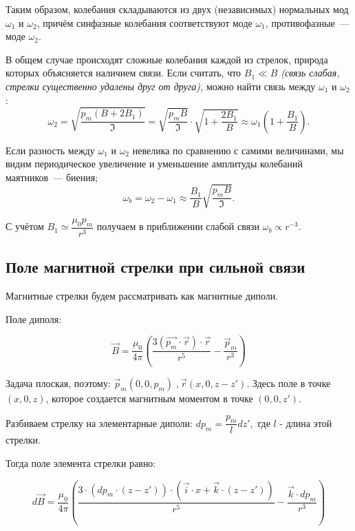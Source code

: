 \documentclass{letask}
\begin{document}
Таким образом, колебания складываются из двух (независимых) нормальных мод $\omega_1$ и $\omega_2$, причём синфазные колебания соответствуют моде $\omega_1$, противофазные~--- моде $\omega_2$.

В общем случае происходят сложные колебания каждой из стрелок, природа которых объясняется наличием связи. Если считать, что $B_1 \ll B$ \emph{(связь слабая, стрелки существенно удалены друг от друга),} можно найти связь между $\omega_1$ и $\omega_2$:
\begin{equation}
\omega_2 = \sqrt{\dfrac{p_m(B+2B_1)}{\mathfrak{I}}} = \sqrt{\dfrac{p_m B}{\mathfrak{I}}} \cdot \sqrt{1+\dfrac{2B_1}{B}} \approx \omega_1 \left( 1+\dfrac{B_1}{B} \right).
\end{equation}

Если разность между $\omega_1$ и $\omega_2$ невелика по сравнению с самими величинами, мы видим периодическое увеличение и уменьшение амплитуды колебаний маятников~--- биения;
\begin{equation}
\omega_b = \omega_2 - \omega_1 \approx \dfrac{B_1}{B} \sqrt{\dfrac{p_m B}{\mathfrak{I}}}.
\end{equation}

С учётом $B_1 \simeq \dfrac{\mu_0 p_m}{r^3}$ получаем в приближении слабой связи $\omega_b \propto r^{-3}$.

\subsection{Поле магнитной стрелки при сильной связи}

Магнитные стрелки будем рассматривать как магнитные диполи. 

Поле диполя:

$$\vec{B} = \dfrac{\mu_0}{4 \pi} \left(\dfrac{3(\vec{p_m} \cdot\vec{r}) \cdot \vec{r}}{r^5} - \dfrac{\vec p_m}{r^3}\right)$$

Задача плоская, поэтому: $\vec p_m (0, 0, p_m) \; , \vec r (x, 0, z-z')$. Здесь поле в точке $(x, 0, z)$, которое создается магнитным моментом в точке $(0,0,z')$.



Разбиваем стрелку на элементарные диполи: $dp_m = \dfrac{p_m}{l} dz',$ где $l$ - длина этой стрелки.

Тогда поле элемента стрелки равно:

\begin{equation}
d \vec{B} = \dfrac{\mu_0}{4 \pi}
	\left(
		\dfrac{3 \cdot 
			\left(dp_m \cdot (z-z') \right) 
			\cdot 
			\left( \vec{i} \cdot x + \vec{k} \cdot (z-z') \right)
		}{r^5}
	- \dfrac{\vec{k} \cdot dp_m}{r^3} 
	\right)
\end{equation}
\end{document}
